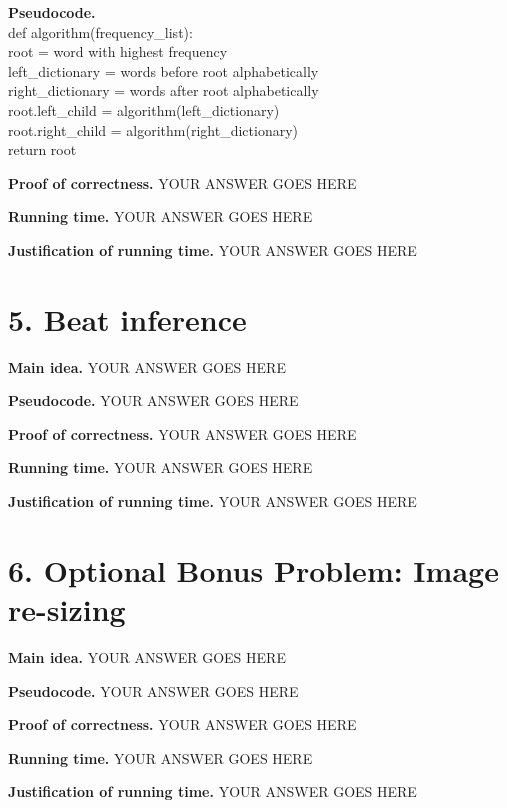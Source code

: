 \documentclass[11pt]{article}
\begin{document}
\noindent
\textbf{Pseudocode.}\\
def algorithm(frequency\_list): \\
\indent root = word with highest frequency \\
\indent left\_dictionary = words before root alphabetically \\
\indent right\_dictionary = words after root alphabetically \\
\indent root.left\_child = algorithm(left\_dictionary) \\
\indent root.right\_child = algorithm(right\_dictionary) \\
\indent return root

\noindent
\textbf{Proof of correctness.}
YOUR ANSWER GOES HERE


\noindent
\textbf{Running time.}
YOUR ANSWER GOES HERE


\noindent
\textbf{Justification of running time.}
YOUR ANSWER GOES HERE


\newpage
\section*{5. Beat inference}
\noindent
\textbf{Main idea.}
YOUR ANSWER GOES HERE


\noindent
\textbf{Pseudocode.}
YOUR ANSWER GOES HERE

\noindent
\textbf{Proof of correctness.}
YOUR ANSWER GOES HERE


\noindent
\textbf{Running time.}
YOUR ANSWER GOES HERE


\noindent
\textbf{Justification of running time.}
YOUR ANSWER GOES HERE


\newpage
\section*{6. Optional Bonus Problem: Image re-sizing}
\noindent
\textbf{Main idea.}
YOUR ANSWER GOES HERE


\noindent
\textbf{Pseudocode.}
YOUR ANSWER GOES HERE

\noindent
\textbf{Proof of correctness.}
YOUR ANSWER GOES HERE


\noindent
\textbf{Running time.}
YOUR ANSWER GOES HERE


\noindent
\textbf{Justification of running time.}
YOUR ANSWER GOES HERE
\end{document}
